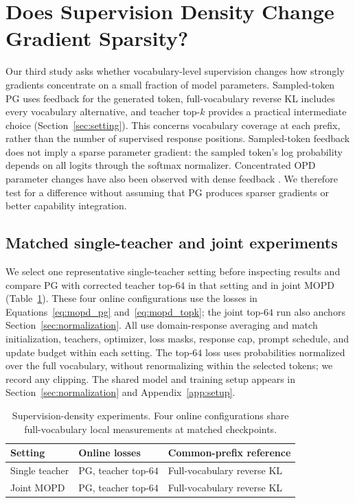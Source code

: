 \section{Does Supervision Density Change Gradient Sparsity?}
\label{sec:density}

Our third study asks whether vocabulary-level supervision changes how
strongly gradients concentrate on a small fraction of model parameters.
Sampled-token PG uses feedback for the generated token, full-vocabulary
reverse KL includes every vocabulary alternative, and teacher top-$k$
provides a practical intermediate choice
(Section~\ref{sec:setting}). This concerns vocabulary coverage at each
prefix, rather than the number of supervised response positions.
Sampled-token feedback does not imply a sparse parameter gradient:
the sampled token's log probability depends on all logits through the
softmax normalizer. Concentrated OPD parameter changes have also been
observed with dense feedback \citep{yu2026denseupdates}. We therefore
test for a difference without assuming that PG produces sparser gradients
or better capability integration.

\subsection{Matched single-teacher and joint experiments}

We select one representative single-teacher setting before inspecting
results and compare PG with corrected teacher top-$64$ in that setting
and in joint MOPD (Table~\ref{tab:density_controls}). These four online
configurations use the losses in Equations~\ref{eq:mopd_pg}
and~\ref{eq:mopd_topk}; the joint top-$64$ run also anchors
Section~\ref{sec:normalization}. All use domain-response averaging and
match initialization, teachers, optimizer, loss masks, response cap,
prompt schedule, and update budget within each setting. The top-$64$
loss uses probabilities normalized over the full vocabulary, without
renormalizing within the selected tokens; we record any clipping.
The shared model and training setup appears in
Section~\ref{sec:normalization} and Appendix~\ref{app:setup}.

\begin{table}[!htbp]
\centering
\small
\begin{tabular}{lll}
\toprule
Setting & Online losses & Common-prefix reference \\
\midrule
Single teacher & PG, teacher top-$64$ & Full-vocabulary reverse KL \\
Joint MOPD & PG, teacher top-$64$ & Full-vocabulary reverse KL \\
\bottomrule
\end{tabular}
\caption{Supervision-density experiments. Four online configurations
share full-vocabulary local measurements at matched checkpoints.}
\label{tab:density_controls}
\end{table}

